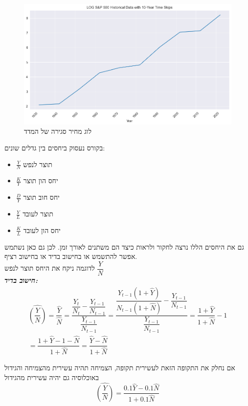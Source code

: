 \documentclass[a4paper,12pt]{article}
\begin{document}
\begin{RTL}
\begin{hebrew}
\begin{figure}[H]
    \centering
    \includegraphics[width=1\linewidth]{LOG S&P500.png}
    \caption{לוג מחיר סגירה של המדד}
\end{figure}
בקורס נעסוק ביחסים בין גדלים שונים:
\begin{itemize}
    \item $\frac{Y}{N}$ תוצר לנפש
    \item $\frac{K}{Y}$ יחס הון תוצר
    \item $\frac{D}{Y}$ יחס חוב תוצר
    \item $\frac{Y}{L}$ תוצר לעובד
    \item $\frac{K}{L}$ יחס הון לעובד
\end{itemize}
גם את היחסים הללו נרצה לחקור ולראות כיצד הם משתנים לאורך זמן. לכן גם כאן נשתמש אפשר להתשמש או בחישוב בדיד או בחישוב רציף.
\\
לדוגמה ניקח את היחס תוצר לנפש $\dfrac{Y}{N}$ \\
\textbf{\textit{חישוב בדיד:}}
\begin{multline*}
\widehat{\left(\dfrac{{Y}}{N}\right)} = \dfrac{\widehat{Y}}{\widehat{N}}=\dfrac{\dfrac{Y_t}{N_t}-\dfrac{Y_{t-1}}{N_{t-1}}}{\dfrac{Y_{t-1}}{N_{t-1}}}=\dfrac{\dfrac{Y_{t-1}(1+\widehat{Y})}{N_{t-1}(1+\widehat{N})}-\dfrac{Y_{t-1}}{N_{t-1}}}{\dfrac{Y_{t-1}}{N_{t-1}}}=\dfrac{1+\widehat{Y}}{1+\widehat{N}}-1 \\
= \dfrac{1+\widehat{Y}-1-\widehat{N}}{1+\widehat{N}}=\dfrac{\widehat{Y}-\widehat{N}}{1+\widehat{N}}
\end{multline*}

אם נחלק את התקופה הזאת לעשירית תקופה, הצמיחה תהיה עשירית מהצמיחה והגידול באוכלוסיה גם יהיה עשירית מהגידול
\begin{equation*}
    \widehat{\left(\frac{Y}{N}\right)}
    = \dfrac{0.1\widehat Y - 0.1 \widehat N} {1 + 0.1\widehat N}
\end{equation*}


\end{hebrew}
\end{RTL}
\end{document}
